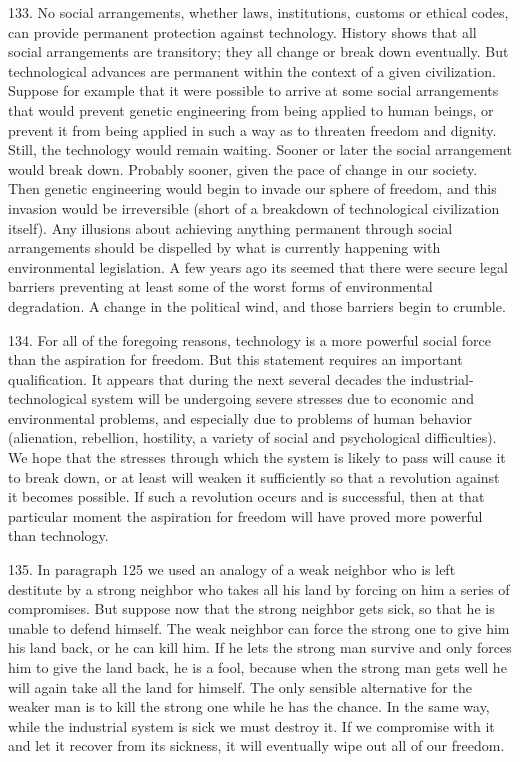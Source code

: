 \documentclass{article}
\begin{document}
133. No social arrangements, whether laws, institutions, customs or ethical codes, can provide 
permanent protection against technology. History shows that all social arrangements are 
transitory; they all change or break down eventually. But technological advances are permanent 
within the context of a given civilization. Suppose for example that it were possible to arrive at 
some social arrangements that would prevent genetic engineering from being applied to human 
beings, or prevent it from being applied in such a way as to threaten freedom and dignity. Still, 
the technology would remain waiting. Sooner or later the social arrangement would break 
down. Probably sooner, given the pace of change in our society. Then genetic engineering would 
begin to invade our sphere of freedom, and this invasion would be irreversible (short of a 
breakdown of technological civilization itself). Any illusions about achieving anything permanent 
through social arrangements should be dispelled by what is currently happening with 
environmental legislation. A few years ago its seemed that there were secure legal barriers 
preventing at least some of the worst forms of environmental degradation. A change in the political 
wind, and those barriers begin to crumble. \vspace{\baselineskip} \newline

134. For all of the foregoing reasons, technology is a more powerful social force than the 
aspiration for freedom. But this statement requires an important qualification. It appears that 
during the next several decades the industrial-technological system will be undergoing severe 
stresses due to economic and environmental problems, and especially due to problems of human 
behavior (alienation, rebellion, hostility, a variety of social and psychological difficulties). We 
hope that the stresses through which the system is likely to pass will cause it to break down, or at 
least will weaken it sufficiently so that a revolution against it becomes possible. If such a 
revolution occurs and is successful, then at that particular moment the aspiration for freedom will 
have proved more powerful than technology. \vspace{\baselineskip}

135. In paragraph 125 we used an analogy of a weak neighbor who is left destitute by a strong 
neighbor who takes all his land by forcing on him a series of compromises. But suppose now that 
the strong neighbor gets sick, so that he is unable to defend himself. The weak neighbor can force 
the strong one to give him his land back, or he can kill him. If he lets the strong man survive and 
only forces him to give the land back, he is a fool, because when the strong man gets well he will 
again take all the land for himself. The only sensible alternative for the weaker man is to kill the 
strong one while he has the chance. In the same way, while the industrial system is sick we must 
destroy it. If we compromise with it and let it recover from its sickness, it will eventually wipe 
out all of our freedom. 
\end{document}
